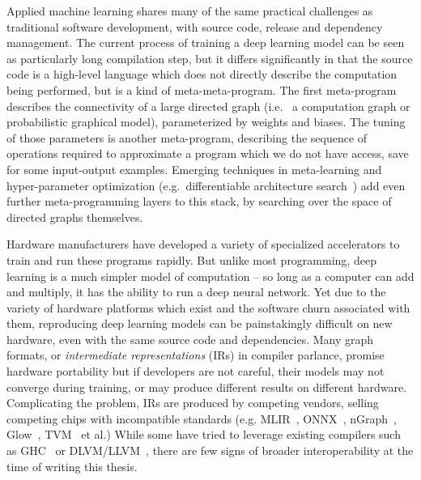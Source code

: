 Applied machine learning shares many of the same practical challenges as traditional software development, with source code, release and dependency management. The current process of training a deep learning model can be seen as particularly long compilation step, but it differs significantly in that the source code is a high-level language which does not directly describe the computation being performed, but is a kind of meta-meta-program. The first meta-program describes the connectivity of a large directed graph (i.e.~ a computation graph or probabilistic graphical model), parameterized by weights and biases. The tuning of those parameters is another meta-program, describing the sequence of operations required to approximate a program which we do not have access, save for some input-output examples. Emerging techniques in meta-learning and hyper-parameter optimization (e.g.~differentiable architecture search~\citep{liu2018darts}) add even further meta-programming layers to this stack, by searching over the space of directed graphs themselves.

Hardware manufacturers have developed a variety of specialized accelerators to train and run these programs rapidly. But unlike most programming, deep learning is a much simpler model of computation -- so long as a computer can add and multiply, it has the ability to run a deep neural network. Yet due to the variety of hardware platforms which exist and the software churn associated with them, reproducing deep learning models can be painstakingly difficult on new hardware, even with the same source code and dependencies. Many graph formats, or \textit{intermediate representations} (IRs) in compiler parlance, promise hardware portability but if developers are not careful, their models may not converge during training, or may produce different results on different hardware. Complicating the problem, IRs are produced by competing vendors, selling competing chips with incompatible standards (e.g. MLIR~\citep{mlir}, ONNX~\citep{bai2019}, nGraph~\citep{cyphers2018intel}, Glow~\citep{rotem2018glow}, TVM~\citep{tvm2018} et al.) While some have tried to leverage existing compilers such as GHC~\citep{elliott2018simple} or DLVM/LLVM~\citep{wei2017dlvm}, there are few signs of broader interoperability at the time of writing this thesis.

